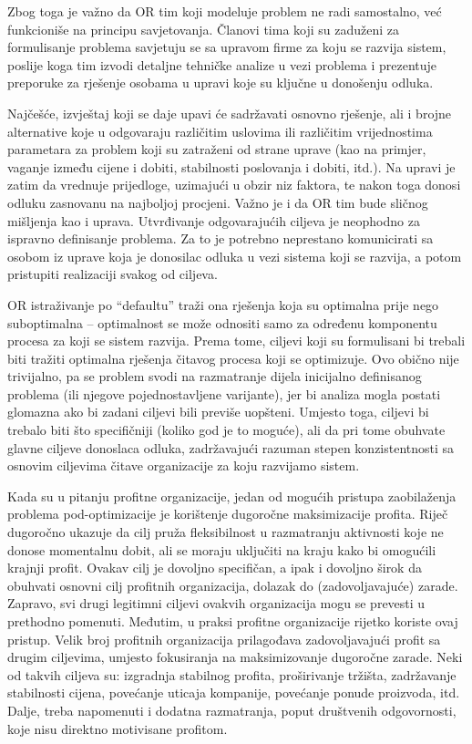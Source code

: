 \documentclass[a4paper, utf8, 11pt, colorlinks]{book}
\begin{document}
Zbog toga je važno da OR tim koji   modeluje problem  ne radi samostalno, već funkcioniše na principu savjetovanja. Članovi tima koji su zaduženi za formulisanje problema savjetuju se sa upravom firme za koju se razvija sistem, poslije koga tim izvodi detaljne tehničke analize u vezi problema i prezentuje preporuke za rješenje  osobama u upravi koje su ključne u donošenju odluka.   


Najčešće, izvještaj koji se daje upavi će sadržavati osnovno rješenje, ali i brojne alternative koje u odgovaraju različitim uslovima ili različitim  vrijednostima parametara za problem koji su zatraženi od strane uprave (kao na primjer, vaganje između cijene i dobiti, stabilnosti poslovanja i dobiti, itd.). Na upravi je zatim da vrednuje prijedloge, uzimajući u obzir  niz faktora, te nakon toga donosi odluku zasnovanu na najboljoj procjeni. Važno je i da OR tim bude sličnog mišljenja kao i uprava. Utvrđivanje odgovarajućih ciljeva je  neophodno za ispravno definisanje problema.  Za to je potrebno neprestano komunicirati sa osobom iz uprave koja je donosilac odluka u vezi sistema koji se razvija, a potom pristupiti  realizaciji svakog od ciljeva.

OR istraživanje po ``defaultu'' traži ona rješenja koja su optimalna prije nego suboptimalna -- optimalnost se može odnositi samo za određenu komponentu procesa za koji se sistem razvija. Prema tome, ciljevi koji su formulisani bi trebali biti tražiti optimalna rješenja čitavog procesa koji se optimizuje.  Ovo obično nije trivijalno, pa se problem svodi na razmatranje dijela inicijalno definisanog problema (ili njegove pojednostavljene varijante), jer bi analiza mogla postati glomazna ako bi zadani ciljevi bili previše uopšteni. Umjesto toga, ciljevi bi trebalo biti što specifičniji (koliko god je to moguće), ali da pri tome obuhvate glavne ciljeve donoslaca odluka, zadržavajući razuman stepen konzistentnosti sa osnovim ciljevima čitave organizacije za koju razvijamo sistem. 

Kada su u pitanju profitne organizacije, jedan od mogućih pristupa zaobilaženja problema pod-optimizacije je korištenje dugoročne maksimizacije profita. Riječ dugoročno ukazuje da cilj pruža fleksibilnost u razmatranju aktivnosti koje ne donose momentalnu dobit, ali se moraju uključiti na kraju kako bi omogućili krajnji profit. Ovakav cilj je dovoljno specifičan, a ipak i dovoljno širok da obuhvati osnovni cilj profitnih organizacija, dolazak do (zadovoljavajuće) zarade. Zapravo, svi drugi legitimni ciljevi ovakvih organizacija mogu se prevesti u prethodno pomenuti. Međutim, u praksi profitne organizacije rijetko koriste ovaj pristup. Velik broj profitnih organizacija prilagođava zadovoljavajući profit sa drugim ciljevima, umjesto fokusiranja na maksimizovanje dugoročne zarade. Neki od takvih ciljeva su: izgradnja stabilnog profita, proširivanje tržišta, zadržavanje stabilnosti cijena, povećanje uticaja kompanije, povećanje ponude proizvoda, itd. 
Dalje, treba napomenuti i dodatna razmatranja, poput društvenih odgovornosti, koje nisu direktno motivisane profitom.  
\end{document}
